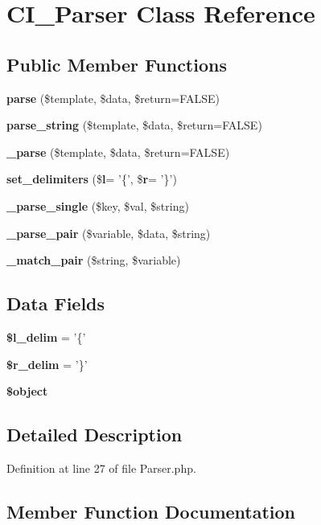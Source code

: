 \section{C\-I\-\_\-\-Parser Class Reference}
\label{class_c_i___parser}
\subsection*{Public Member Functions}
\begin{DoxyCompactItemize}
\item 
{\bf parse} (\$template, \$data, \$return=F\-A\-L\-S\-E)
\item 
{\bf parse\-\_\-string} (\$template, \$data, \$return=F\-A\-L\-S\-E)
\item 
{\bf \-\_\-parse} (\$template, \$data, \$return=F\-A\-L\-S\-E)
\item 
{\bf set\-\_\-delimiters} (\${\bf l}= '\{', \${\bf r}= '\}')
\item 
{\bf \-\_\-parse\-\_\-single} (\$key, \$val, \$string)
\item 
{\bf \-\_\-parse\-\_\-pair} (\$variable, \$data, \$string)
\item 
{\bf \-\_\-match\-\_\-pair} (\$string, \$variable)
\end{DoxyCompactItemize}
\subsection*{Data Fields}
\begin{DoxyCompactItemize}
\item 
{\bf \$l\-\_\-delim} = '\{'
\item 
{\bf \$r\-\_\-delim} = '\}'
\item 
{\bf \$object}
\end{DoxyCompactItemize}


\subsection{Detailed Description}


Definition at line 27 of file Parser.\-php.



\subsection{Member Function Documentation}
